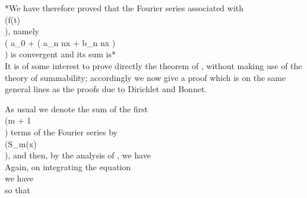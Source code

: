 *We have therefore proved that the Fourier series associated with
  \\(f(t)\\), namely
  \\(
   a_{0}
  + \sum \left(
    a_{n} \cos nx
    +
    b_{n} \sin nx
  \right)
  \\)
  is convergent and its sum is*
\\[ 
\frac{1}{2} \left\{
  f(x+0) + f(x-0)
\right\}
\\] 
It is of some interest to prove directly the theorem of ,
without making use of the theory of summability; accordingly we now
give a proof which is on the same general lines as the proofs due to
Dirichlet and Bonnet.
%
%

As usual we denote the sum of the first \\(m + 1\\) terms of the Fourier
series by \\(S_{m}(x)\\), and then, by the analysis of , we have
\\[ 
S_{m}(x)
=
\frac{1}{\pi}
\! \int_{0}^{\frac{1}{2} \pi}\!
\frac{\sin (2m+1)\theta}{\sin \theta}
\f(x + 2\theta)
\, d \theta
+
\frac{1}{\pi}
\! \int_{0}^{\frac{1}{2} \pi}\!
\frac{\sin (2m+1)\theta}{\sin \theta}
\f(x - 2\theta)
\, d \theta.
\\] 

Again, on integrating the equation
\\[ 
\frac{\sin (2m+1)\theta}{\sin \theta}
=
1
+ 2 \cos 2\theta
+ 2 \cos 4\theta
+ \cdots
+ 2 \cos 2m\theta,
\\] 
we have
\\[ 
\int_{0}^{\frac{1}{2}\pi}\!
\frac{\sin (2m+1)\theta}{\sin \theta}
\, d \theta
=
\frac{1}{2}\pi,
\\] 
so that
\\[ \begin{align*}
  TODO
\end{align*} \\]

